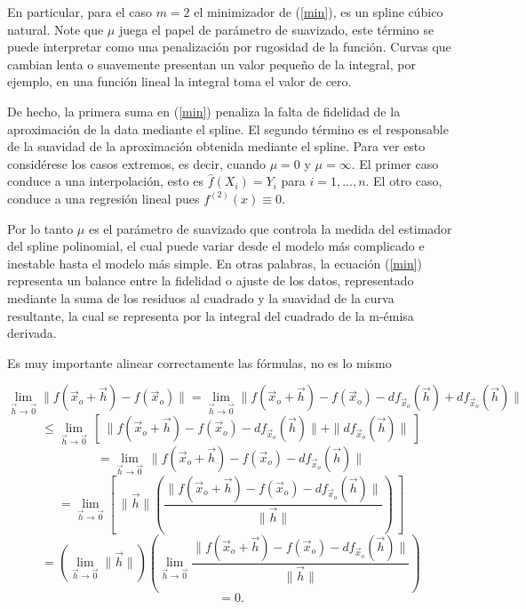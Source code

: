 \vspace{0.5cm}

\hspace{0.4cm} En particular, para el caso $m=2$ el minimizador de (\ref{min}), es un spline c\'ubico natural. Note que $\mu$ juega el papel de par\'ametro de suavizado, este t\'ermino se puede interpretar como una penalizaci\'on por rugosidad de la funci\'on. Curvas que cambian lenta o suavemente presentan un valor peque\~no de la integral, por ejemplo, en una funci\'on lineal la integral toma el valor de cero.

\vspace{0.5cm}

\hspace{0.4cm} De hecho, la primera suma en (\ref{min}) penaliza la falta de fidelidad de la aproximaci\'on de la data mediante el spline. El segundo t\'ermino es el responsable de la suavidad de la aproximaci\'on obtenida mediante el spline. Para ver esto consid\'erese los casos extremos, es decir, cuando $\mu =0$ y $\mu=\infty$. El primer caso conduce a una interpolaci\'on, esto es $\hat{f}(X_{i})=Y_{i}$ para $i=1,...,n$. El otro caso, conduce a una regresi\'on lineal pues $f^{(2)}(x)\equiv 0$.

\vspace{0.5cm}

\hspace{0.4cm} Por lo tanto $\mu$ es el par\'ametro de suavizado que controla la medida del estimador del spline polinomial, el cual puede variar desde el modelo m\'as complicado e inestable hasta el modelo m\'as simple. En otras palabras, la ecuaci\'on (\ref{min}) representa un balance entre la fidelidad o ajuste de los datos, representado mediante la suma de los residuos al cuadrado y la suavidad de la curva resultante, la cual se representa por la integral del cuadrado de la m-\'emisa derivada.








\newpage

Es muy importante alinear correctamente las f\'ormulas, no es lo mismo


$$\lim_{\vec{h} \rightarrow\vec{0}} \| f(\vec{x}_o +\vec{h}) - f(\vec{x}_o) \| = \lim_{\vec{h}
\rightarrow\vec{0}} \| f(\vec{x}_o +\vec{h}) - f(\vec{x}_o) - df_{\vec{x}_o}(\vec{h}) +
df_{\vec{x}_o}(\vec{h}) \|$$
$$ \leq  \lim_{\vec{h} \rightarrow\vec{0}}\,\left[ \:\| f(\vec{x}_o +\vec{h}) - f(\vec{x}_o) -
df_{\vec{x}_o}(\vec{h}) \| + \| df_{\vec{x}_o}(\vec{h}) \|\: \right]$$
$$ =  \lim_{\vec{h} \rightarrow\vec{0}}\,\| f(\vec{x}_o +\vec{h}) - f(\vec{x}_o) -
df_{\vec{x}_o}(\vec{h}) \|$$
$$ = \lim_{\vec{h} \rightarrow\vec{0}}\left[ \: \| \vec{h}\|\left( \frac{\| f(\vec{x}_o
+\vec{h}) - f(\vec{x}_o) - df_{\vec{x}_o}(\vec{h})\| }{\| \vec{h}\| }
 \right)   \:\right]$$
$$= \left( \lim_{\vec{h} \rightarrow\vec{0}}   \| \vec{h}\|\right) \left( \lim_{\vec{h}
\rightarrow\vec{0}} \frac{\| f(\vec{x}_o +\vec{h}) - f(\vec{x}_o) -
df_{\vec{x}_o}(\vec{h})\|}{\| \vec{h}\| }  \right) $$
  $$= 0.$$

